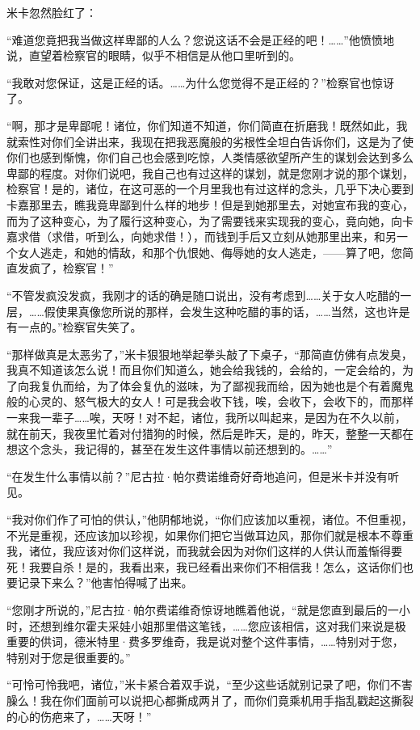 \par 米卡忽然脸红了：
\par “难道您竟把我当做这样卑鄙的人么？您说这话不会是正经的吧！……”他愤愤地说，直望着检察官的眼睛，似乎不相信是从他口里听到的。
\par “我敢对您保证，这是正经的话。……为什么您觉得不是正经的？”检察官也惊讶了。
\par “啊，那才是卑鄙呢！诸位，你们知道不知道，你们简直在折磨我！既然如此，我就索性对你们全讲出来，我现在把我恶魔般的劣根性全坦白告诉你们，这是为了使你们也感到惭愧，你们自己也会感到吃惊，人类情感欲望所产生的谋划会达到多么卑鄙的程度。对你们说吧，我自己也有过这样的谋划，就是您刚才说的那个谋划，检察官！是的，诸位，在这可恶的一个月里我也有过这样的念头，几乎下决心要到卡嘉那里去，瞧我竟卑鄙到什么样的地步！但是到她那里去，对她宣布我的变心，而为了这种变心，为了履行这种变心，为了需要钱来实现我的变心，竟向她，向卡嘉求借（求借，听到么，向她求借！），而钱到手后又立刻从她那里出来，和另一个女人逃走，和她的情敌，和那个仇恨她、侮辱她的女人逃走，——算了吧，您简直发疯了，检察官！”
\par “不管发疯没发疯，我刚才的话的确是随口说出，没有考虑到……关于女人吃醋的一层，……假使果真像您所说的那样，会发生这种吃醋的事的话，……当然，这也许是有一点的。”检察官失笑了。
\par “那样做真是太恶劣了，”米卡狠狠地举起拳头敲了下桌子，“那简直仿佛有点发臭，我真不知道该怎么说！而且你们知道么，她会给我钱的，会给的，一定会给的，为了向我复仇而给，为了体会复仇的滋味，为了鄙视我而给，因为她也是个有着魔鬼般的心灵的、怒气极大的女人！可是我会收下钱，唉，会收下，会收下的，而那样一来我一辈子……唉，天呀！对不起，诸位，我所以叫起来，是因为在不久以前，就在前天，我夜里忙着对付猎狗的时候，然后是昨天，是的，昨天，整整一天都在想这个念头，我记得的，甚至在发生这件事情以前还想到的。……”
\par “在发生什么事情以前？”尼古拉·帕尔费诺维奇好奇地追问，但是米卡并没有听见。
\par “我对你们作了可怕的供认，”他阴郁地说，“你们应该加以重视，诸位。不但重视，不光是重视，还应该加以珍视，如果你们把它当做耳边风，那你们就是根本不尊重我，诸位，我应该对你们这样说，而我就会因为对你们这样的人供认而羞惭得要死！我要自杀！是的，我看出来，我已经看出来你们不相信我！怎么，这话你们也要记录下来么？”他害怕得喊了出来。
\par “您刚才所说的，”尼古拉·帕尔费诺维奇惊讶地瞧着他说，“就是您直到最后的一小时，还想到维尔霍夫采娃小姐那里借这笔钱，……您应该相信，这对我们来说是极重要的供词，德米特里·费多罗维奇，我是说对整个这件事情，……特别对于您，特别对于您是很重要的。”
\par “可怜可怜我吧，诸位，”米卡紧合着双手说，“至少这些话就别记录了吧，你们不害臊么！我在你们面前可以说把心都撕成两爿了，而你们竟乘机用手指乱戳起这撕裂的心的伤疤来了，……天呀！”
